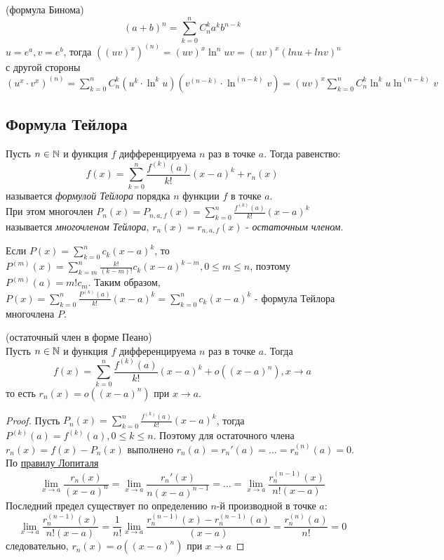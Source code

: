 \begin{corollary} (формула Бинома)\\
    \[(a+b)^n = \sum_{k = 0}^{n} C_{n}^{k}a^kb^{n-k}\]
    $u = e^a, v = e^b$, тогда $((uv)^x)^{(n)} = (uv)^x\ln^nuv = (uv)^x(lnu+lnv)^n$\\
    с другой стороны $(u^x\cdot v^x)^{(n)} = \sum_{k = 0}^{n}C_n^k(u^k\cdot \ln^ku)(v^{(n-k)}\cdot \ln^{(n-k)}v) = (uv)^x\sum_{k = 0}^{n}C_n^k\ln^ku\ln^{(n-k)}v$
\end{corollary}

\subsection{Формула Тейлора}

\begin{definition}
    Пусть $n \in \mathbb{N}$ и функция $f$ дифференцируема $n$ раз в точке $a$.
    Тогда равенство:
    \[f(x) = \sum_{k = 0}^{n} \frac{f^{(k)}(a)}{k!}(x-a)^k + r_n(x)\]
    называется \textit{формулой Тейлора} порядка $n$ функции $f$ в точке $a$.\\
    При этом многочлен $P_n(x) = P_{n, a, f}(x) = \sum_{k = 0}^{n} \frac{f^{(k)}(a)}{k!}(x-a)^k$
    называется \textit{многочленом Тейлора},
    $r_n(x) = r_{n, a, f}(x)$ - \textit{остаточным членом}.
\end{definition}

\begin{example}
    Если $P(x) = \sum_{k = 0}^{n}c_k(x-a)^k$,
    то $P^{(m)}(x) = \sum_{k = m}^{n} \frac{k!}{(k-m)!}c_k(x-a)^{k-m}, 0 \leq m \leq n$,
    поэтому $P^{(m)}(a) = m!c_m$. Таким образом, $P(x) = \sum_{k = 0}^{n} \frac{P^{(k)}(a)}{k!}(x-a)^k = \sum_{k = 0}^{n}c_k(x-a)^k$
    - формула Тейлора многочлена $P$.
\end{example}

\begin{theorem} (остаточный член в форме Пеано)\\
    Пусть $n \in \mathbb{N}$ и функция $f$ дифференцируема $n$ раз в точке $a$.
    Тогда \[f(x) = \sum_{k = 0}^{n} \frac{f^{(k)}(a)}{k!}(x-a)^k + o((x-a)^n), x \to a\]
    то есть $r_n(x) = o((x-a)^n)$ при $x \to a$.
\end{theorem}

\begin{proof}
    Пусть $P_n(x) = \sum_{k = 0}^n \frac{f^{(k)}(a)}{k!}(x-a)^k$,
    тогда $P^{(k)}(a) = f^{(k)}(a), 0 \leq k \leq n$.
    Поэтому для остаточного члена $r_n(x) = f(x) - P_n(x)$
    выполнено $r_n(a) = r_n'(a) = \dots = r_n^{(n)}(a) = 0$.
    По \hyperlink{zero_on_zero_th}{правилу Лопиталя}
    \[\lim_{x \to a} \frac{r_n(x)}{(x-a)^n} = \lim_{x \to a} \frac{r_n'(x)}{n(x-a)^{n-1}} = \dots = \lim_{x \to a} \frac{r_n^{(n-1)}(x)}{n!(x-a)}\]
    Последний предел существует по определению $n$-й производной в точке $a$:
    \[\lim_{x \to a} \frac{r_n^{(n-1)}(x)}{n!(x-a)} = \frac{1}{n!}\lim_{x \to a} \frac{r_n^{(n-1)}(x) - r_n^{(n-1)}(a)}{(x-a)} = \frac{r_n^{(n)}(a)}{n!} = 0\]
    следовательно, $r_n(x) = o((x-a)^n)$ при $x \to a$
\end{proof}

